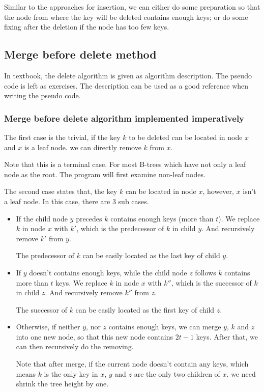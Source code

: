 \documentclass{article}
\begin{document}
Similar to the approaches for insertion, we can either do some preparation
so that the node from where the key will be deleted contains enough
keys; or do some fixing after the deletion if the node has too few keys.


\subsection{Merge before delete method}

In textbook\cite{CLRS}, the delete algorithm is given as algorithm description.
The pseudo code is left as exercises. The description can be used
as a good reference when writing the pseudo code.

\subsubsection{Merge before delete algorithm implemented imperatively}

The first case is the trivial, if the key $k$ to be deleted
can be located in node $x$ and $x$ is a leaf node. we can directly
remove $k$ from $x$.

Note that this is a terminal case. For most B-trees which have
not only a leaf node as the root. The program will first examine
non-leaf nodes.

The second case states that, the key $k$ can be located in node $x$,
however, $x$ isn't a leaf node. In this case, there are 3 sub cases.

\begin{itemize}
\item If the child node $y$ precedes $k$ contains enough keys (more than $t$).
We replace $k$ in node $x$ with $k'$, which is
the predecessor of $k$ in child $y$. And recursively remove $k'$
from $y$.

The predecessor of $k$ can be easily located as the last key of child
$y$.

\item If $y$ doesn't contains enough keys, while the child node $z$
follows $k$ contains more than $t$ keys. We replace $k$ in node $x$
with $k''$, which is the successor of $k$ in child $z$. And recursively
remove $k''$ from $z$.

The successor of $k$ can be easily located as the first key of child $z$.

\item Otherwise, if neither $y$, nor $z$ contains enough keys, we
can merge $y$, $k$ and $z$ into one new node, so that this new node
contains $2t-1$ keys. After that, we can then recursively do the removing.

Note that after merge, if the current node doesn't contain any keys,
which means $k$ is the only key in $x$, $y$ and $z$ are the only two
children of $x$. we need shrink the tree height by one.
\end{itemize}
\end{document}
